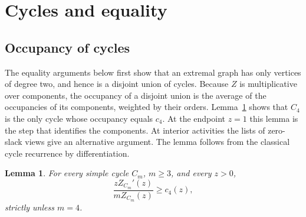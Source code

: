 \documentclass[11pt]{article}
\newtheorem{lemma}[theorem]{Lemma}
\begin{document}
\section{Cycles and equality}\label{sec:equality}
\subsection{Occupancy of cycles}
The equality arguments below first show that an extremal graph has only vertices of degree two, and hence is a disjoint union of cycles. Because $Z$ is multiplicative over components, the occupancy of a disjoint union is the average of the occupancies of its components, weighted by their orders. Lemma~\ref{lem:cycles} shows that $C_4$ is the only cycle whose occupancy equals $c_4$. At the endpoint $z=1$ this lemma is the step that identifies the components. At interior activities the lists of zero-slack views give an alternative argument. The lemma follows from the classical cycle recurrence by differentiation.
\begin{lemma}\label{lem:cycles}
For every simple cycle $C_m$, $m\ge3$, and every $z>0$,
\[
 \frac{zZ_{C_m}'(z)}{mZ_{C_m}(z)}\ge c_4(z),
\]
strictly unless $m=4$.
\end{lemma}
\end{document}
